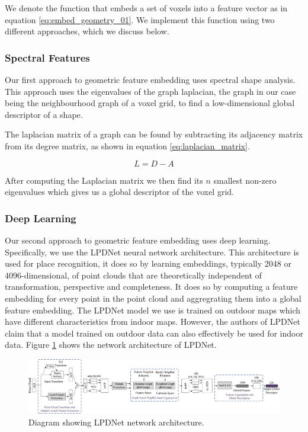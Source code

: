 We denote the function that embeds a set of voxels into a feature vector as in equation \ref{eq:embed_geometry_01}. We implement this function using two different approaches, which we discuss below.

\subsubsection{Spectral Features}
Our first approach to geometric feature embedding uses spectral shape analysis. This approach uses the eigenvalues of the graph laplacian, the graph in our case being the neighbourhood graph of a voxel grid, to find a low-dimensional global descriptor of a shape. 

The laplacian matrix of a graph can be found by subtracting its adjacency matrix from its degree matrix, as shown in equation \ref{eq:laplacian_matrix}.

\begin{equation}
    \label{eq:laplacian_matrix}
L = D - A
\end{equation}

After computing the Laplacian matrix we then find its \(n\) smallest 
non-zero eigenvalues which gives us a global descriptor of the voxel grid. 


\subsubsection{Deep Learning}
Our second approach to geometric feature embedding uses deep learning. Specifically, we use the LPDNet neural network architecture. This architecture is used for place recognition, it does so by learning embeddings, typically 2048 or 4096-dimensional, of point clouds that are theoretically independent of transformation, perspective and completeness. It does so by computing a feature embedding for every point in the point cloud and aggregrating them into a global feature embedding. The LPDNet model we use is trained on outdoor maps which have different characteristics from indoor maps. However, the authors of LPDNet claim that a model trained on outdoor data can also effectively be used for indoor data. Figure \ref{fig:lpdnet_architecture} shows the network architecture of LPDNet.


\begin{figure}[h]
    \centering
    \includegraphics*[width=\textwidth]{./fig/network_architecture.png}
    \caption{Diagram showing LPDNet network architecture.}
    \label{fig:lpdnet_architecture}
\end{figure}

